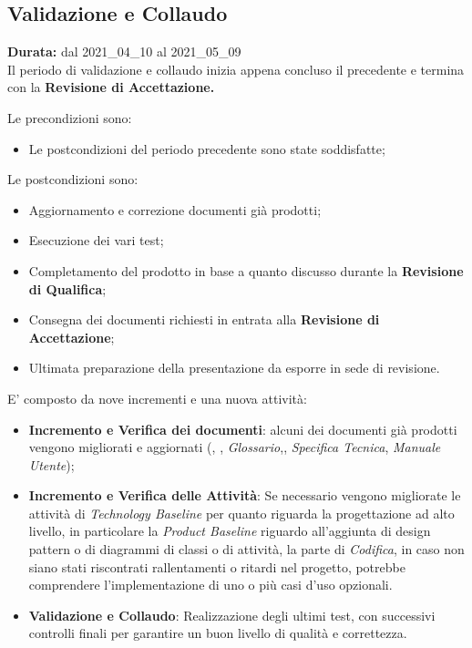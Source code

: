 \subsection{Validazione e Collaudo}
\label{validazione_e_collaudo}
\textbf{Durata:} dal 2021\_04\_10 al 2021\_05\_09 \\
Il periodo di validazione e collaudo inizia appena concluso il precedente e termina con la \textbf{Revisione di Accettazione.}

Le precondizioni sono:
\begin{itemize}
    \item Le postcondizioni del periodo precedente sono state soddisfatte;
\end{itemize}

Le postcondizioni sono:
\begin{itemize}
    \item Aggiornamento e correzione documenti già prodotti;
    \item Esecuzione dei vari test;
    \item Completamento del prodotto in base a quanto discusso durante la \textbf{Revisione di Qualifica};
    \item Consegna dei documenti richiesti in entrata alla \textbf{Revisione di Accettazione};
    \item Ultimata preparazione della presentazione da esporre in sede di revisione.
\end{itemize}
E' composto da nove incrementi e una nuova attività:
\begin{itemize}
    \item \textbf{Incremento e Verifica dei documenti}: alcuni dei documenti già prodotti vengono migliorati e aggiornati (\textit{\NdP}, \textit{\PdP}, \textit{Glossario},\textit{\PdQ}, \textit{Specifica Tecnica}, \textit{Manuale Utente}); 
    \item \textbf{Incremento e Verifica delle Attività}: Se necessario vengono migliorate le attività di \textit{Technology Baseline} per quanto riguarda la progettazione ad alto livello, in particolare la \textit{Product Baseline} riguardo all'aggiunta di design pattern o di diagrammi di classi o di attività, la parte di \textit{Codifica}, in caso non siano stati riscontrati rallentamenti o ritardi nel progetto, potrebbe comprendere l'implementazione di uno o più casi d'uso opzionali.
    \item \textbf{Validazione e Collaudo}: Realizzazione degli ultimi test, con successivi controlli finali per garantire un buon livello di qualità e correttezza.
\end{itemize}


